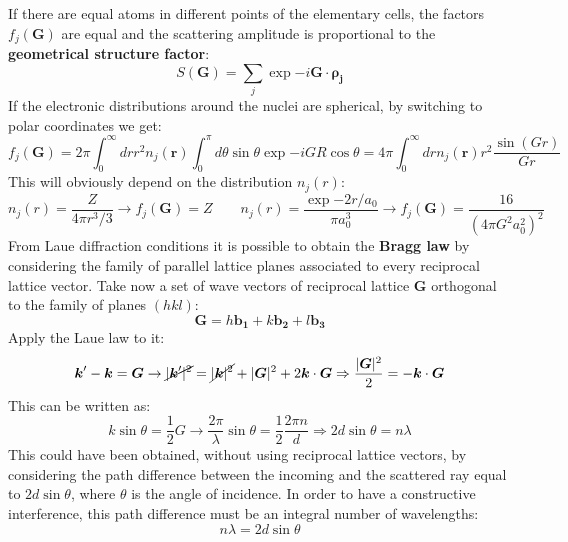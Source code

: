 \documentclass[10.75pt,a4paper,openright,bottom=2cm]{article}
\renewcommand{\Vec}[1]{\boldsymbol{#1}}
\begin{document}
If there are equal atoms in different points of the elementary cells, the factors $f_j(\Vec{G})$ are equal and the scattering amplitude is proportional to the \textbf{geometrical structure factor}:
\[
S(\Vec{G})=\sum_j\exp{-i\Vec{G}\cdot\Vec{\rho_j}}
\]
If the electronic distributions around the nuclei are spherical, by switching to polar coordinates we get:
\[
f_j(\Vec{G})=2\pi\int_0^\infty drr^2n_j(\Vec{r})\int_0^\pi d\theta\sin\theta\exp{-iGR\cos\theta}=4\pi\int_0^\infty drn_j(\Vec{r})r^2\frac{\sin(Gr)}{Gr}
\]
This will obviously depend on the distribution $n_j(r)$:
\[
n_j(r)=\frac{Z}{4\pi r^3/3}\to f_j(\Vec{G})=Z \qquad n_j(r)=\frac{\exp{-2r/a_0}}{\pi a_0^3}\to f_j(\Vec{G})=\frac{16}{(4\pi G^2a_0^2)^2}
\]
From Laue diffraction conditions it is possible to obtain the \textbf{Bragg law} by considering the family of parallel lattice planes associated to every reciprocal lattice vector. Take now a set of wave vectors of reciprocal lattice $\Vec{G}$ orthogonal to the family of planes $(hkl)$:
\[
\Vec{G}=h\Vec{b_1}+k\Vec{b_2}+l\Vec{b_3}
\]
Apply the Laue law to it:
\[
\Vec{k}'-\Vec{k}=\Vec{G}\to\cancel{|\Vec{k}'|^2}=\cancel{|\Vec{k}|^2}+|\Vec{G}|^2+2\Vec{k}\cdot\Vec{G}\Rightarrow\frac{|\Vec{G}|^2}{2}=-\Vec{k}\cdot\Vec{G}
\]
This can be written as:
\[
k\sin\theta=\frac{1}{2}G\to\frac{2\pi}{\lambda}\sin\theta=\frac{1}{2}\frac{2\pi n}{d}\Rightarrow2d\sin\theta=n\lambda
\]
This could have been obtained, without using reciprocal lattice vectors, by considering the path difference between the incoming and the scattered ray equal to $2d\sin\theta$, where $\theta$ is the angle of incidence. In order to have a constructive interference, this path difference must be an integral number of wavelengths:
\[
n\lambda=2d\sin\theta
\]
\end{document}

